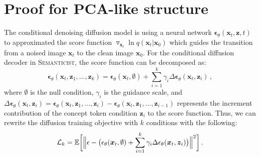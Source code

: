 \documentclass[10pt,twocolumn,letterpaper]{article}
\DeclareRobustCommand{\modelname}{\textsc{Semanticist}\xspace}
\begin{document}
\clearpage
\setcounter{page}{1}
\maketitlesupplementary
\appendix

{
  \hypersetup{linkcolor=black}
  \tableofcontents
}

\section{Proof for PCA-like structure}
\label{sec:PCA_proof}

The conditional denoising diffusion model is using a neural network $\bm{\epsilon}_{\theta}(\bm{x}_t, \bm{z}, t)$ to approximated the score function  $\triangledown_{\bm{x}_t}  \ln{q(\bm{x}_t | \bm{x}_0)} $ which guides the transition from a noised image $\bm{x}_t$ to the clean image $\bm{x}_0$.
For the conditional diffusion decoder in \modelname, the score function can be decomposed as:
\begin{equation}
\bm{\epsilon}_{\theta}(\bm{x}_t, \bm{z}_1, \dots, \bm{z}_k) = \bm{\epsilon}_{\theta}(\bm{x}_t, \emptyset) + \sum_{i=1}^k \gamma_i \Delta \bm{\epsilon}_{\theta}(\bm{x}_t, \bm{z}_i) \,, \nonumber
\end{equation}
where $\emptyset$ is the null condition, $\gamma_i$ is the guidance scale, and $\Delta \bm{\epsilon}_{\theta}(\bm{x}_t, \bm{z}_i)=\bm{\epsilon}_{\theta}(\bm{x}_t, \bm{z}_1, \dots, \bm{z}_i) - \bm{\epsilon}_{\theta}(\bm{x}_t, \bm{z}_1, \dots, \bm{z}_{i-1})$ represents the increment contribution of the concept token condition $\bm{z}_i$ to the score function.
Thus, we can rewrite the diffusion training objective with $k$ conditions with the following:
\begin{equation}
\mathcal{L}_k = \mathbb{E} \biggl[ \Bigl\| \epsilon - \bigl( \epsilon_\theta(\bm{x}_t, \emptyset) + \sum_{i=1}^k \gamma_i \Delta \epsilon_\theta(\bm{x}_t, \bm{z}_i) \bigr) \Bigr\|^2 \biggr] \,. \nonumber
\end{equation}
\end{document}
